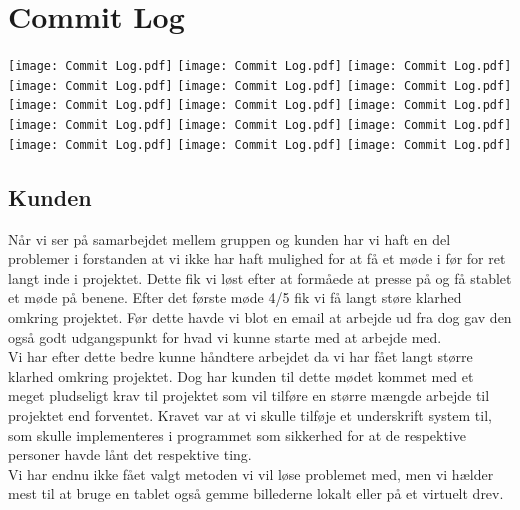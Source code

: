 \documentclass[a4paper]{article}
\begin{document}
\section{Commit Log}
\texttt{[image: Commit Log.pdf]}
\newpage
\texttt{[image: Commit Log.pdf]}
\newpage
\texttt{[image: Commit Log.pdf]}
\newpage
\texttt{[image: Commit Log.pdf]}
\newpage
\texttt{[image: Commit Log.pdf]}
\newpage
\texttt{[image: Commit Log.pdf]}
\newpage
\texttt{[image: Commit Log.pdf]}
\newpage
\texttt{[image: Commit Log.pdf]}
\newpage
\texttt{[image: Commit Log.pdf]}
\newpage
\texttt{[image: Commit Log.pdf]}
\newpage
\texttt{[image: Commit Log.pdf]}
\newpage
\texttt{[image: Commit Log.pdf]}
\newpage
\texttt{[image: Commit Log.pdf]}
\newpage
\texttt{[image: Commit Log.pdf]}
\newpage
\texttt{[image: Commit Log.pdf]}
\newpage
\subsection{Kunden}
Når vi ser på samarbejdet mellem gruppen og kunden har vi haft en del problemer i forstanden at vi ikke har haft mulighed for at få et møde i før for ret langt inde i projektet. Dette fik vi løst efter at formåede at presse på og få stablet et møde på benene. Efter det første møde 4/5 fik vi få langt støre klarhed omkring projektet. Før dette havde vi blot en email at arbejde ud fra dog gav den også godt udgangspunkt for hvad vi kunne starte med at arbejde med.\\
Vi har efter dette bedre kunne håndtere arbejdet da vi har fået langt større klarhed omkring projektet. Dog har kunden til dette mødet kommet med et meget pludseligt krav til projektet som vil tilføre en større mængde arbejde til projektet end forventet. Kravet var at vi skulle tilføje et underskrift system til, som skulle implementeres i programmet som sikkerhed for at de respektive personer havde lånt det respektive ting.\\
Vi har endnu ikke fået valgt metoden vi vil løse problemet med, men vi hælder mest til at bruge en tablet også gemme billederne lokalt eller på et virtuelt drev.\\
\end{document}
